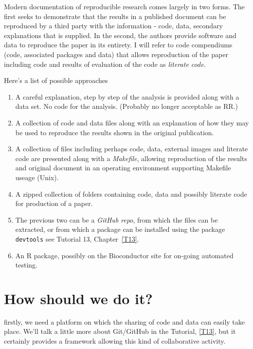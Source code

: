 \documentclass[titlepage]{book}\usepackage{knitr}
\begin{document}
Modern documentation of reproducible research comes largely in two forms. The first seeks to demonstrate that the results in a published document can be reproduced by a third party with the information - code, data, secondary explanations that is supplied. In the second,  the authors provide software and data to reproduce the paper in its entirety. I will refer to code compendiums\cite{Gentleman2004} (code, associated packages and data) that allows reproduction of the paper including code and  results of evaluation of the code as \emph{literate code}.

Here's a list of possible approaches

\begin{enumerate}
\item{ A careful explanation, step by step of the analysis is provided along with a data set. No code for the analysis. (Probably no longer acceptable as RR.)}
\item {A collection of code and data files along with an explanation of how they may be used to reproduce the results shown in the original publication.}
\item {A collection of files including perhaps code, data, external images and  literate code are presented along with a \emph{Makefile}, allowing reproduction of the results and original document in an operating environment supporting Makefile useage (Unix)}.
\item {A zipped collection of folders containing code, data and possibly literate code for production of a paper.}\label{zip1}
\item{The previous two can be a \emph{GitHub repo}, from which the files can be extracted, or from which a package can be installed using the package \texttt{devtools} see Tutorial 13, Chapter~\ref{T13}.}
\item{An R package, possibly on the Bioconductor site for on-going automated testing.}

\end{enumerate}


\section{How should we do it?}
firstly, we need a platform on which the sharing of code and data can easily take place.
We'll talk a little more about Git/GitHub in the Tutorial, \ref{T13}, but it certainly provides a framework allowing this kind of collaborative activity.
\end{document}
